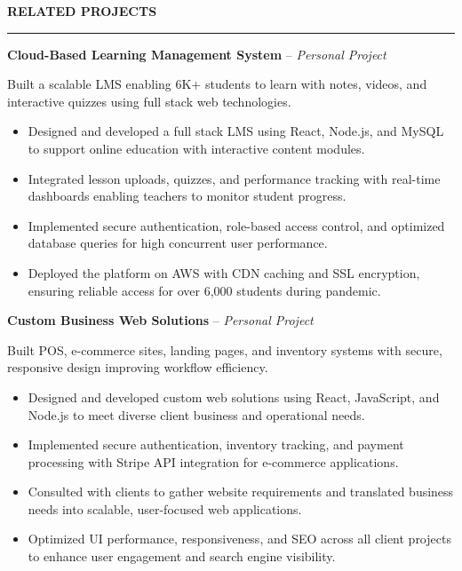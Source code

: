 \documentclass[10pt,letterpaper]{article}
\begin{document}
\vspace{6pt}

\textbf{RELATED PROJECTS}\\[-8pt]
\noindent\rule{\textwidth}{1pt}

\vspace{-2pt}

\textbf{Cloud-Based Learning Management System} -- \emph{Personal Project}

\vspace{-1pt}

Built a scalable LMS enabling 6K+ students to learn with notes, videos, and interactive quizzes using full stack web technologies.
\vspace{-1pt}
\begin{itemize}
\item Designed and developed a full stack LMS using React, Node.js, and MySQL to support online education with interactive content modules.
\item Integrated lesson uploads, quizzes, and performance tracking with real-time dashboards enabling teachers to monitor student progress.
\item Implemented secure authentication, role-based access control, and optimized database queries for high concurrent user performance.
\item Deployed the platform on AWS with CDN caching and SSL encryption, ensuring reliable access for over 6,000 students during pandemic.
\end{itemize}

\textbf{Custom Business Web Solutions} -- \emph{Personal Project}

\vspace{-1pt}

Built POS, e-commerce sites, landing pages, and inventory systems with secure, responsive design improving workflow efficiency.
\vspace{-1pt}
\begin{itemize}
\item Designed and developed custom web solutions using React, JavaScript, and Node.js to meet diverse client business and operational needs.
\item Implemented secure authentication, inventory tracking, and payment processing with Stripe API integration for e-commerce applications.
\item Consulted with clients to gather website requirements and translated business needs into scalable, user-focused web applications.
\item Optimized UI performance, responsiveness, and SEO across all client projects to enhance user engagement and search engine visibility.
\end{itemize}
\end{document}
